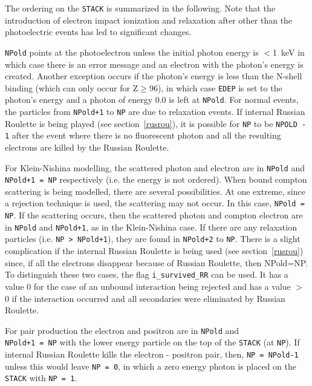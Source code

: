 The ordering on the {\tt STACK} is summarized in the following.  Note that
the introduction of electron impact ionization and relaxation after other
than the photoelectric events has led to significant changes.
\begin{description}

\item[Photoelectric] {\tt NPold} points at the photoelectron unless the initial
photon energy is $<$1~keV in which case there is an error message and an
electron with the photon's energy is created. Another exception occurs if
the photon's energy is less than the N-shell binding (which can only occur
for Z$\ge$96), in which case {\tt EDEP} is set to the photon's energy and a
photon of energy 0.0 is left at {\tt NPold}.  For normal events, the
particles from \verb^NPold+1^ to {\tt NP} are due to relaxation events.  If
internal Russian Roulette is being played (see section~\ref{rusrou}), it is
possible for {\tt NP} to be {\tt NPOLD - 1} after the event where there is
no fluorescent photon and all the resulting electrons are killed by the
Russian Roulette.  

\item[Compton scattering] For Klein-Nishina modelling, the scattered photon and
electron are in {\tt NPold} and \verb^NPold+1 = NP^ respectively (i.e. the energy is not
ordered).  When bound compton scattering is
being modelled, there are several possibilities. At one extreme, since a
rejection technique is used, the scattering may not occur. In this case,
\verb^NPold = NP^.  If the scattering occurs, then the scattered photon and
compton electron are in \verb^NPold^ and \verb^NPold+1^, as in the Klein-Nishina case. If
there are any relaxation particles (i.e. \verb^NP > NPold+1^), they are found
in \verb^NPold+2^ to \verb^NP^.  There is a slight complication if the internal Russian
Roulette is being used (see section~\ref{rusrou})
since, if all the electrons disappear because of Russian Roulette, then
NPold=NP. To distinguish these two cases, the flag {\tt i\_survived\_RR}
can be used. It has a value 0 for the case of an unbound interaction being
rejected and has a value $>$ 0 if the interaction occurred and all
secondaries were eliminated by Russian Roulette.

\item[Pair Production] For pair production the electron and positron are
in {\tt NPold} and\\ \verb^NPold+1 = NP^ with the lower energy particle on the
top of the {\tt STACK} (at \verb^NP^). If internal Russian Roulette kills
the electron - positron pair, then,
\verb^NP = NPold-1^ unless this would leave \verb^NP = 0^, in which a
zero energy photon is placed on the {\tt STACK} with \verb^NP = 1^.


\end{description}
